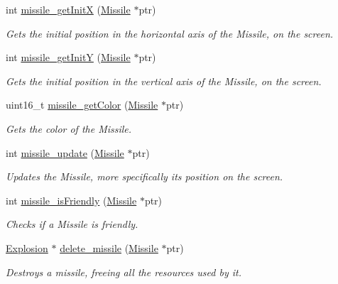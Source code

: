 \begin{DoxyCompactItemize}
int \hyperlink{group___missile_ga6bcfcaf70f8810ab5f93275926fea9b8}{missile\+\_\+get\+InitX} (\hyperlink{group___missile_ga7ea98f7c879356e5dfa41934529d86e1}{Missile} $\ast$ptr)
\begin{DoxyCompactList}\small\item\em Gets the initial position in the horizontal axis of the Missile, on the screen. \end{DoxyCompactList}\item 
int \hyperlink{group___missile_ga6083be12aadde673a28d0a391391f96e}{missile\+\_\+get\+InitY} (\hyperlink{group___missile_ga7ea98f7c879356e5dfa41934529d86e1}{Missile} $\ast$ptr)
\begin{DoxyCompactList}\small\item\em Gets the initial position in the vertical axis of the Missile, on the screen. \end{DoxyCompactList}\item 
uint16\+\_\+t \hyperlink{group___missile_gafd665dec928dec0b42baf150444daa58}{missile\+\_\+get\+Color} (\hyperlink{group___missile_ga7ea98f7c879356e5dfa41934529d86e1}{Missile} $\ast$ptr)
\begin{DoxyCompactList}\small\item\em Gets the color of the Missile. \end{DoxyCompactList}\item 
int \hyperlink{group___missile_ga6d0e1c431aa7534db74504a9505a7b60}{missile\+\_\+update} (\hyperlink{group___missile_ga7ea98f7c879356e5dfa41934529d86e1}{Missile} $\ast$ptr)
\begin{DoxyCompactList}\small\item\em Updates the Missile, more specifically its position on the screen. \end{DoxyCompactList}\item 
int \hyperlink{group___missile_gae9eff55a2ebd486cc44daf149176e771}{missile\+\_\+is\+Friendly} (\hyperlink{group___missile_ga7ea98f7c879356e5dfa41934529d86e1}{Missile} $\ast$ptr)
\begin{DoxyCompactList}\small\item\em Checks if a Missile is friendly. \end{DoxyCompactList}\item 
\hyperlink{group___missile_gab15157e0eccd9297f66644015d4966b1}{Explosion} $\ast$ \hyperlink{group___missile_ga693cd51b6557695cb6593b56fbc89df8}{delete\+\_\+missile} (\hyperlink{group___missile_ga7ea98f7c879356e5dfa41934529d86e1}{Missile} $\ast$ptr)
\begin{DoxyCompactList}\small\item\em Destroys a missile, freeing all the resources used by it. \end{DoxyCompactList}\item 

\end{DoxyCompactItemize}
